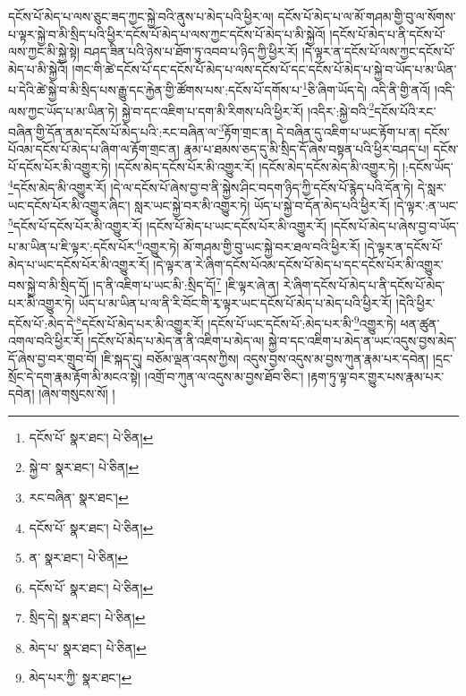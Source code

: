 དངོས་པོ་མེད་པ་ལས་ཅུང་ཟད་ཀྱང་སྐྱེ་བའི་ནུས་པ་མེད་པའི་ཕྱིར་ལ། དངོས་པོ་མེད་པ་ལ་མོ་གཤམ་གྱི་བུ་ལ་སོགས་པ་ལྟར་སྐྱེ་བ་མི་སྲིད་པའི་ཕྱིར་དངོས་པོ་མེད་པ་ལས་ཀྱང་དངོས་པོ་མེད་པ་མི་སྐྱེའོ། །དངོས་པོ་མེད་པ་ནི་དངོས་པོ་ལས་ཀྱང་མི་སྐྱེ་སྟེ། བཤད་ཟིན་པའི་ཉེས་པ་ཐོག་ཏུ་འབབ་པ་ཉིད་ཀྱི་ཕྱིར་རོ། །དེ་ལྟར་ན་དངོས་པོ་ལས་ཀྱང་དངོས་པོ་མེད་པ་མི་སྐྱེའོ། །གང་གི་ཚེ་དངོས་པོ་དང་དངོས་པོ་མེད་པ་ལས་དངོས་པོ་དང་དངོས་པོ་མེད་པ་སྐྱེ་བ་ཡོད་པ་མ་ཡིན་པ་དེའི་ཚེ་སྐྱེ་བ་མི་སྲིད་པས་རྒྱུ་དང་རྐྱེན་གྱི་ཚོགས་པས་:དངོས་པོ་དགོས་པ་\footnote{དངོས་པོ་  སྣར་ཐང་།  པེ་ཅིན། }ཅི་ཞིག་ཡོད་དེ། འདི་ནི་གྱི་ནའོ། །འདི་ལས་ཀྱང་ཡོད་པ་མ་ཡིན་ཏེ། སྐྱེ་བ་དང་འཇིག་པ་དག་མི་རིགས་པའི་ཕྱིར་རོ། །འདིར་:སྐྱེ་བའི་\footnote{སྐྱེ་བ་  སྣར་ཐང་།  པེ་ཅིན། }དངོས་པོའི་རང་བཞིན་གྱི་དོན་ནམ་དངོས་པོ་མེད་པའི་:རང་བཞིན་ལ་\footnote{རང་བཞིན་  སྣར་ཐང་། }རྟོག་གྲང་ན། དེ་བཞིན་དུ་འཇིག་པ་ཡང་རྟོག་པ་ན། དངོས་པོའམ་དངོས་པོ་མེད་པ་ཞིག་ལ་རྟོག་གྲང་ན། རྣམ་པ་ཐམས་ཅད་དུ་མི་སྲིད་དོ་ཞེས་བསྟན་པའི་ཕྱིར་བཤད་པ། དངོས་པོ་དངོས་པོར་མི་འགྱུར་ཏེ། །དངོས་མེད་དངོས་པོར་མི་འགྱུར་རོ། །དངོས་མེད་དངོས་མེད་མི་འགྱུར་ཏེ། །:དངོས་ཡོད་\footnote{དངོས་པོ་  སྣར་ཐང་།  པེ་ཅིན། }དངོས་མེད་མི་འགྱུར་རོ། །དེ་ལ་དངོས་པོ་ཞེས་བྱ་བ་ནི་སྐྱེས་ཤིང་བདག་ཉིད་ཀྱི་དངོས་པོ་རྙེད་པའི་དོན་ཏེ། དེ་སླར་ཡང་དངོས་པོར་མི་འགྱུར་ཞིང་། སླར་ཡང་སྐྱེ་བར་མི་འགྱུར་ཏེ། ཡོད་པ་སྐྱེ་བ་དོན་མེད་པའི་ཕྱིར་རོ། །དེ་ལྟར་:ན་ཡང་\footnote{ན་  སྣར་ཐང་།  པེ་ཅིན། }དངོས་པོ་དངོས་པོར་མི་འགྱུར་རོ། །དངོས་པོ་མེད་པ་ཡང་དངོས་པོར་མི་འགྱུར་རོ། །དངོས་པོ་མེད་པ་ཞེས་བྱ་བ་ཡོད་པ་མ་ཡིན་པ་ཇི་ལྟར་:དངོས་པོར་\footnote{དངོས་པོ་  སྣར་ཐང་།  པེ་ཅིན། }འགྱུར་ཏེ། མོ་གཤམ་གྱི་བུ་ཡང་སྐྱེ་བར་ཐལ་བའི་ཕྱིར་རོ། །དེ་ལྟར་ན་དངོས་པོ་མེད་པ་ཡང་དངོས་པོར་མི་འགྱུར་རོ། །དེ་ལྟར་ན་རེ་ཞིག་དངོས་པོའམ་དངོས་པོ་མེད་པ་དང་དངོས་པོར་མི་འགྱུར་བས་སྐྱེ་བ་མི་སྲིད་དོ། །ད་ནི་འཇིག་པ་ཡང་མི་:སྲིད་དོ།\footnote{སྲིད་དེ།  སྣར་ཐང་།  པེ་ཅིན། } །ཇི་ལྟར་ཞེ་ན། རེ་ཞིག་དངོས་པོ་མེད་པ་ནི་དངོས་པོ་མེད་པར་མི་འགྱུར་ཏེ། ཡོད་པ་མ་ཡིན་པ་ལ་ནི་རི་བོང་གི་རྭ་ལྟར་ཡང་དངོས་པོ་མེད་པ་མེད་པའི་ཕྱིར་རོ། །དེའི་ཕྱིར་དངོས་པོ་:མེད་དེ་\footnote{མེད་པ་  སྣར་ཐང་།  པེ་ཅིན། }དངོས་པོ་མེད་པར་མི་འགྱུར་རོ། །དངོས་པོ་ཡང་དངོས་པོ་:མེད་པར་མི་\footnote{མེད་པར་ཀྱི་  སྣར་ཐང་། }འགྱུར་ཏེ། ཕན་ཚུན་འགལ་བའི་ཕྱིར་རོ། །དངོས་པོ་མེད་པ་མེད་ན་ནི་འཇིག་པ་མེད་ལ། སྐྱེ་བ་དང་འཇིག་པ་མེད་ན་ཡང་འདུས་བྱས་མེད་དོ་ཞེས་བྱ་བར་གྲུབ་བོ། །ཇི་སྐད་དུ། བཅོམ་ལྡན་འདས་ཀྱིས། འདུས་བྱས་འདུས་མ་བྱས་ཀུན་རྣམ་པར་དབེན། །དྲང་སྲོང་དེ་དག་རྣམ་རྟོག་མི་མངའ་སྟེ། །འགྲོ་བ་ཀུན་ལ་འདུས་མ་བྱས་ཐོབ་ཅིང་། །རྟག་ཏུ་ལྟ་བར་གྱུར་པས་རྣམ་པར་དབེན། །ཞེས་གསུངས་སོ། །
